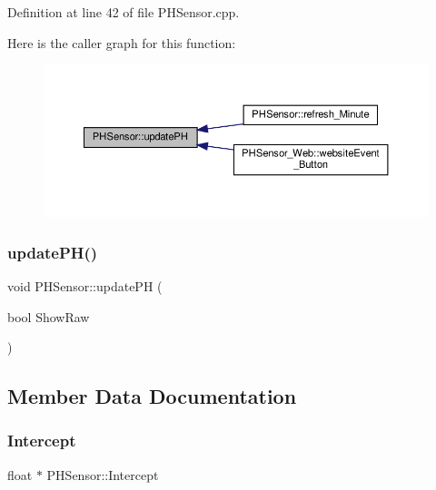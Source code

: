 Definition at line 42 of file P\+H\+Sensor.\+cpp.

Here is the caller graph for this function\+:
\nopagebreak
\begin{figure}[H]
\begin{center}
\leavevmode
\includegraphics[width=350pt]{class_p_h_sensor_aefd9f4f73636b8827a22b8246cbc4dee_icgraph}
\end{center}
\end{figure}
\mbox{\label{class_p_h_sensor_aefd9f4f73636b8827a22b8246cbc4dee}} 
\subsubsection{\texorpdfstring{update\+P\+H()}{updatePH()}\hspace{0.1cm}{\footnotesize\ttfamily [2/2]}}
{\footnotesize\ttfamily void P\+H\+Sensor\+::update\+PH (\begin{DoxyParamCaption}\item[{bool}]{Show\+Raw }\end{DoxyParamCaption})\hspace{0.3cm}{\ttfamily [protected]}}



\subsection{Member Data Documentation}
\mbox{\label{class_p_h_sensor_a9630af0220d3754863e93965ac8e6d5a}} 
\subsubsection{\texorpdfstring{Intercept}{Intercept}}
{\footnotesize\ttfamily float $\ast$ P\+H\+Sensor\+::\+Intercept\hspace{0.3cm}{\ttfamily [protected]}}



